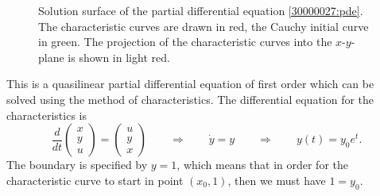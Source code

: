 \begin{loesung}
\begin{figure}
\centering
{}
\caption{Solution surface of the partial differential equation
\eqref{30000027:pde}.
The characteristic curves are drawn in red, the Cauchy initial curve
in green.
The projection of the characteristic curves into the $x$-$y$-plane is
shown in light red.
\label{30000027:fig}}
\end{figure}
This is a quasilinear partial differential equation of first order
which can be solved using the method of characteristics.
The differential equation for the characteristics is
\begin{equation}
\frac{d}{dt}
\begin{pmatrix*}
x\\
y\\
u
\end{pmatrix*}
=
\begin{pmatrix*}
u\\
y\\
x
\end{pmatrix*}
\qquad\Rightarrow\qquad
\dot{y} = y \qquad\Rightarrow\qquad y(t) = y_0e^t.
\end{equation}
The boundary is specified by $y=1$, which means that in order for the 
characteristic curve to start in point $(x_0,1)$, then we must have
$1=y_0$.


\end{loesung}
